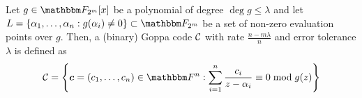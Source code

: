 \begin{definition} 
    Let $g \in \F_{2^m}[x]$ be a polynomial of degree $\deg g \leq \lambda$ and let $L = \{\alpha_1,\dots,\alpha_n : g(\alpha_i) \neq 0\} \subset \F_{2^m}$ be a set of non-zero evaluation points over $g.$
    Then, a (binary) Goppa code $\mathcal{C}$ with rate $\frac{n - m\lambda}{n}$ and error tolerance $\lambda$ is defined as
    \[\calC = \left\{\bc = (c_1,\dots,c_n) \in \F^n: \sum_{i = 1}^n \frac{c_i}{z - \alpha_i} \equiv 0 \bmod g(z)\right\}\]
\end{definition}